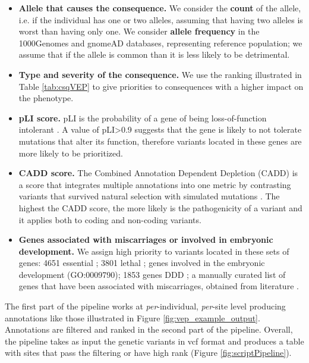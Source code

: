\begin{itemize}
\item \textbf{Allele that causes the consequence.} We consider the \textbf{count} of the allele, i.e. if the individual has one or two alleles, assuming that having two alleles is worst than having only one. We consider \textbf{allele frequency} in the 1000Genomes \cite{1000genome2015global} and gnomeAD \cite{karczewskigenome} databases, representing reference population; we assume that if the allele is common than it is less likely to be detrimental. 
\item \textbf{Type and severity of the consequence.} We use the ranking illustrated in Table \ref{tab:csqVEP} to give priorities to consequences with a higher impact on the phenotype. 
\item \textbf{pLI score.} pLI is the probability of a gene of being loss-of-function intolerant \cite{lek2016analysis}. A value of pLI>0.9 suggests that the gene is likely to not tolerate mutations that alter its function, therefore variants located in these genes are more likely to be prioritized. 
\item \textbf{CADD score.} The Combined Annotation Dependent Depletion (CADD) is a score that integrates multiple annotations into one metric by contrasting variants that survived natural selection with simulated mutations \cite{kircher2014general,rentzsch2019cadd}. The highest the CADD score, the more likely is the pathogenicity of a variant and it applies both to coding and non-coding variants. 
\item \textbf{Genes associated with miscarriages or involved in embryonic development.} We assign high priority to variants located in these sets of genes: 4651 essential \cite{blomen2015gene,wang2015identification,hart2015high}; 3801 lethal \cite{dawes2019gene}; genes involved in the embryonic development (GO:0009790); 1853 genes DDD \cite{firth2011deciphering,firth2009decipher}; a manually curated list of genes that have been associated with miscarriages, obtained from literature \cite{laisk2019genetic,pereza2017systematic,qiao2016whole,rull2012genetics,colley2019potential,quintero2017novel}. 
\end{itemize}

The first part of the pipeline works at \textit{per}-individual, \textit{per}-site level producing annotations like those illustrated in Figure \ref{fig:vep_example_output}. Annotations are filtered and ranked in the second part of the pipeline. Overall, the pipeline takes as input the genetic variants in vcf format and produces a table with sites that pass the filtering or have high rank (Figure \ref{fig:scriptPipeline}). 


